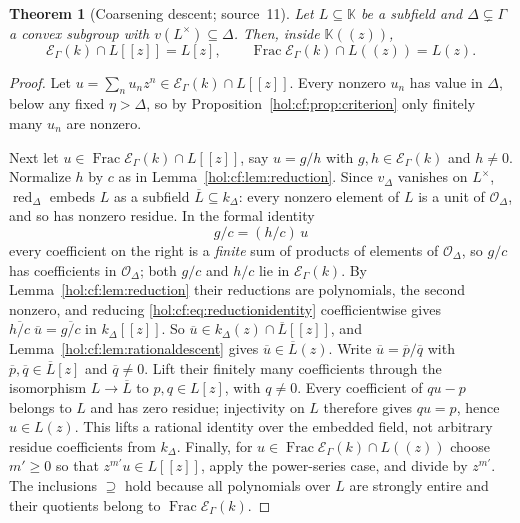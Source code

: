 \documentclass[11pt]{article}
\numberwithin{equation}{section}
\newtheorem{theorem}{Theorem}[section]
\theoremstyle{definition}
\theoremstyle{remark}
\newcommand{\KK}{\mathbb K}
\newcommand{\EK}{\mathcal E_\Gamma(k)}
\newcommand{\FE}{\operatorname{Frac}\EK}
\newcommand{\red}{\operatorname{red}}
\begin{document}
\begin{theorem}[Coarsening descent; source~11]\label{hol:cf:thm:descent}
Let $L\subseteq\KK$ be a subfield and $\Delta\subsetneq\Gamma$ a convex
subgroup with $v(L^\times)\subseteq\Delta$. Then, inside $\KK((z))$,
\begin{equation}\label{hol:cf:eq:descent}
 \EK\cap L[[z]]=L[z],\qquad \FE\cap L((z))=L(z).
\end{equation}
\end{theorem}

\begin{proof}
Let $u=\sum_nu_nz^n\in\EK\cap L[[z]]$. Every nonzero $u_n$ has value in
$\Delta$, below any fixed $\eta>\Delta$, so by
Proposition~\ref{hol:cf:prop:criterion} only finitely many $u_n$ are nonzero.

Next let $u\in\FE\cap L[[z]]$, say $u=g/h$ with $g,h\in\EK$ and $h\ne0$.
Normalize $h$ by $c$ as in Lemma~\ref{hol:cf:lem:reduction}. Since $v_\Delta$
vanishes on $L^\times$, $\red_\Delta$ embeds $L$ as a subfield $\overline
L\subseteq k_\Delta$: every nonzero element of $L$ is a unit of
$\mathcal O_\Delta$, and so has nonzero residue. In the formal identity
\begin{equation}\label{hol:cf:eq:reductionidentity}
 g/c=(h/c)\,u
\end{equation}
every coefficient on the right is a \emph{finite} sum of products of elements
of $\mathcal O_\Delta$, so $g/c$ has coefficients in $\mathcal O_\Delta$; both
$g/c$ and $h/c$ lie in $\EK$. By Lemma~\ref{hol:cf:lem:reduction} their
reductions are polynomials, the second nonzero, and reducing
\eqref{hol:cf:eq:reductionidentity} coefficientwise gives
$\overline{h/c}\;\overline u=\overline{g/c}$ in $k_\Delta[[z]]$. So
$\overline u\in k_\Delta(z)\cap\overline L[[z]]$, and
Lemma~\ref{hol:cf:lem:rationaldescent} gives $\overline u\in\overline L(z)$.
Write $\overline u=\overline p/\overline q$ with
$\overline p,\overline q\in\overline L[z]$ and $\overline q\ne0$.
Lift their finitely many coefficients through the isomorphism
$L\to\overline L$ to $p,q\in L[z]$, with $q\ne0$. Every coefficient of
$qu-p$ belongs to $L$ and has zero residue; injectivity on $L$ therefore
gives $qu=p$, hence $u\in L(z)$. This lifts a rational identity over the
embedded field, not arbitrary residue coefficients from $k_\Delta$.
Finally, for $u\in\FE\cap L((z))$ choose $m'\ge0$ so that
$z^{m'}u\in L[[z]]$, apply the power-series case, and divide by $z^{m'}$.
The inclusions $\supseteq$ hold because all polynomials over $L$ are strongly
entire and their quotients belong to $\FE$.
\end{proof}
\end{document}
